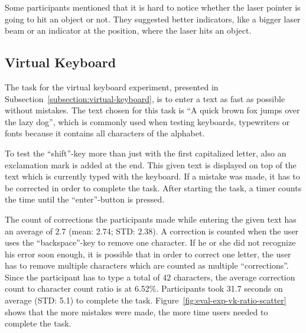 Some participants mentioned that it is hard to notice whether the laser pointer is going to hit an object or not. They suggested better indicators, like a bigger laser beam or an indicator at the position, where the laser hits an object.


\subsection{Virtual Keyboard}\label{section:eval-res-vk}

The task for the virtual keyboard experiment, presented in Subsection~\ref{subsection:virtual-keyboard}, is to enter a text as fast as possible without mistakes. The text chosen for this task is \enquote{A quick brown fox jumps over the lazy dog}, which is commonly used when testing keyboards, typewriters or fonts because it contains all characters of the alphabet.

To test the \enquote{shift}-key more than just with the first capitalized letter, also an exclamation mark is added at the end. This given text is displayed on top of the text which is currently typed with the keyboard. If a mistake was made, it has to be corrected in order to complete the task. After starting the task, a timer counts the time until the \enquote{enter}-button is pressed.

The count of corrections the participants made while entering the given text has an average of 2.7 (mean: 2.74; \gls{STD}: 2.38). A correction is counted when the user uses the \enquote{backspace}-key to remove one character. If he or she did not recognize his error soon enough, it is possible that in order to correct one letter, the user has to remove multiple characters which are counted as multiple \enquote{corrections}. Since the participant has to type a total of 42 characters, the average correction count to character count ratio is at 6.52\%.
Participants took 31.7 seconds on average (\gls{STD}: 5.1) to complete the task. Figure~\ref{fig:eval-exp-vk-ratio-scatter} shows that the more mistakes were made, the more time users needed to complete the task.

